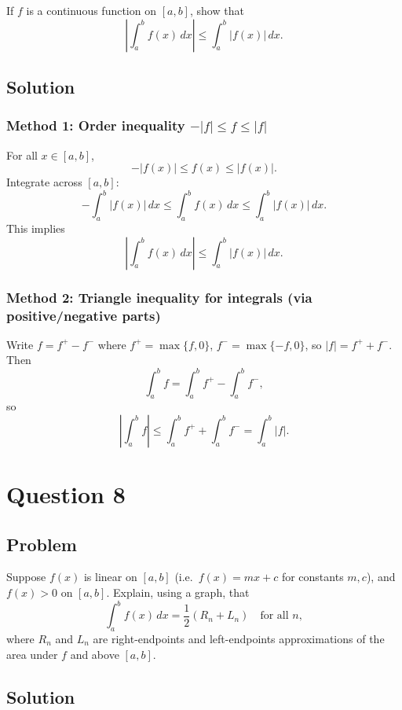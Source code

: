 \documentclass[12pt]{article}
\begin{document}
If \(f\) is a continuous function on \([a,b]\), show that
\[
\left|\int_a^b f(x)\,dx\right|\le \int_a^b |f(x)|\,dx.
\]

\subsection*{Solution}

\subsubsection*{Method 1: Order inequality \(-|f|\le f\le |f|\)}

For all \(x\in[a,b]\),
\[
-|f(x)|\le f(x)\le |f(x)|.
\]
Integrate across \([a,b]\):
\[
-\int_a^b |f(x)|\,dx \le \int_a^b f(x)\,dx \le \int_a^b |f(x)|\,dx.
\]
This implies
\[
\left|\int_a^b f(x)\,dx\right|\le \int_a^b |f(x)|\,dx.
\]

\subsubsection*{Method 2: Triangle inequality for integrals (via positive/negative parts)}

Write \(f=f^+-f^-\) where \(f^+=\max\{f,0\}\), \(f^-=\max\{-f,0\}\), so \(|f|=f^+ + f^-\).
Then
\[
\int_a^b f = \int_a^b f^+ - \int_a^b f^-,
\]
so
\[
\left|\int_a^b f\right|
\le \int_a^b f^+ + \int_a^b f^- = \int_a^b |f|.
\]

\bigskip


\newpage

\section*{Question 8}

\subsection*{Problem}

Suppose \(f(x)\) is linear on \([a,b]\) (i.e.\ \(f(x)=mx+c\) for constants \(m,c\)), and \(f(x)>0\) on \([a,b]\).
Explain, using a graph, that
\[
\int_a^b f(x)\,dx = \frac{1}{2}(R_n + L_n)
\quad\text{for all } n,
\]
where \(R_n\) and \(L_n\) are right-endpoints and left-endpoints approximations of the area under \(f\) and above \([a,b]\).

\subsection*{Solution}
\end{document}
